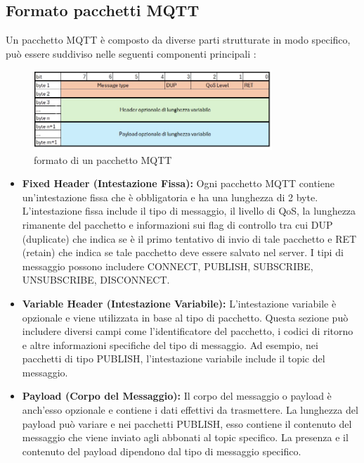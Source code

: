 \documentclass[12pt,a4paper,openright,twoside]{book}
\begin{document}
\subsection{Formato pacchetti MQTT}
Un pacchetto \ac{MQTT} è composto da diverse parti strutturate in modo specifico, può essere suddiviso nelle seguenti componenti principali \cite{mqtt-v5-oasis-doc}:

\begin{figure}[H]
    \centering
    \includegraphics[width=0.8\textwidth]{figures/mqtt-packet.png}
    \caption{formato di un pacchetto MQTT}
    \label{fig:mqtt-packet}
\end{figure}

\begin{itemize}
\item \textbf{Fixed Header (Intestazione Fissa):} Ogni pacchetto \ac{MQTT} contiene un'intestazione fissa che è obbligatoria e ha una lunghezza di 2 byte. 
L'intestazione fissa include il tipo di messaggio, il livello di \ac{QoS}, la lunghezza rimanente del pacchetto e informazioni sui flag di controllo
tra cui DUP (duplicate) che indica se è il primo tentativo di invio di tale pacchetto e RET (retain) che indica se tale pacchetto deve essere salvato nel server.
I tipi di messaggio possono includere CONNECT, PUBLISH, SUBSCRIBE, UNSUBSCRIBE, DISCONNECT.
\item \textbf{Variable Header (Intestazione Variabile):} L'intestazione variabile è opzionale e viene utilizzata in base al tipo di pacchetto. 
Questa sezione può includere diversi campi come l'identificatore del pacchetto, i codici di ritorno e altre informazioni specifiche del tipo di messaggio. 
Ad esempio, nei pacchetti di tipo PUBLISH, l'intestazione variabile include il topic del messaggio.
\item \textbf{Payload (Corpo del Messaggio):} Il corpo del messaggio o payload è anch'esso opzionale e contiene i dati effettivi da trasmettere. 
La lunghezza del payload può variare e nei pacchetti PUBLISH, esso contiene il contenuto del messaggio che viene inviato agli abbonati al topic specifico. 
La presenza e il contenuto del payload dipendono dal tipo di messaggio specifico.
\end{itemize}
\end{document}
